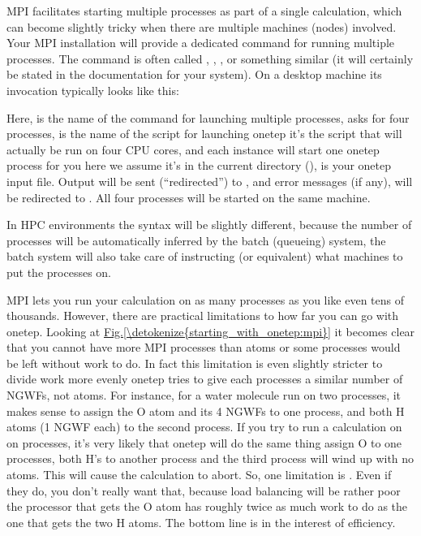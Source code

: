 \documentclass[letterpaper,10pt,english]{sphinxmanual}
\begin{document}
MPI facilitates starting multiple processes as part of a single
calculation, which can become slightly tricky when there are multiple
machines (nodes) involved. Your MPI installation will provide a
dedicated command for running multiple processes. The command is often
called , , ,  or something similar
(it will certainly be stated in the documentation for your system). On a
desktop machine its invocation typically looks like this:


Here,  is the name of the command for launching multiple
processes, asks for four processes,  is the name of
the script for launching onetep \textendash{} it’s the script that will actually be
run on four CPU cores, and each instance will start one onetep process
for you \textendash{} here we assume it’s in the current directory (),
 is your onetep input file. Output will be sent
(“redirected”) to , and error messages (if any), will be
redirected to . All four processes will be started on the
same machine.

In HPC environments the syntax will be slightly different, because the
number of processes will be automatically inferred by the batch
(queueing) system, the batch system will also take care of instructing
 (or equivalent) what machines to put the processes on.

MPI lets you run your calculation on as many processes as you like \textendash{}
even tens of thousands. However, there are practical limitations to how
far you can go with onetep. Looking at \hyperref[\detokenize{starting_with_onetep:mpi}]{Fig.\@ \ref{\detokenize{starting_with_onetep:mpi}}} it becomes clear
that you cannot have more MPI processes than atoms \textendash{} or some processes
would be left without work to do. In fact this limitation is even
slightly stricter \textendash{} to divide work more evenly onetep tries to give each
processes a similar number of NGWFs, not atoms. For instance, for a
water molecule run on two processes, it makes sense to assign the O atom
and its 4 NGWFs to one process, and both H atoms (1 NGWF each) to the
second process. If you try to run a calculation on on  processes,
it’s very likely that onetep will do the same thing \textendash{} assign O to one
processes, both H’s to another process and the third process will wind
up with no atoms. This will cause the calculation to abort. So, one
limitation is . Even if they do, you don’t really want that,
because load balancing will be rather poor \textendash{} the processor that gets the
O atom has roughly twice as much work to do as the one that gets the two
H atoms. The bottom line is \textendash{}  \textendash{} in the interest of efficiency.
\end{document}

